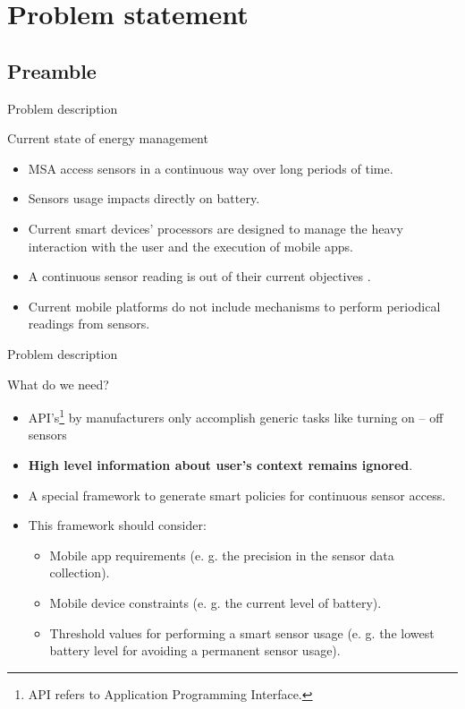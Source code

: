 \section{Problem statement}

\subsection{Preamble}

\begin{frame}{Problem description}
  \begin{block}{Current state of energy management}
    \begin{itemize}
      \item MSA access sensors in a continuous way over long periods of time.
      \item Sensors usage impacts directly on battery.
      \item Current smart devices' processors are designed to manage the heavy interaction with the user and the execution of mobile apps.
      \item A continuous sensor reading is out of their current objectives \citep{Priyantha2011}.
      \item Current mobile platforms do not include mechanisms to perform periodical readings from sensors.
    \end{itemize}
  \end{block}
\end{frame}

\begin{frame}{Problem description}
  \begin{block}{What do we need?}
    \begin{itemize}
      \item API’s\footnote{API refers to Application Programming Interface.} by manufacturers only accomplish generic tasks like turning on – off sensors
      \item \textbf{High level information about user's context remains ignored}.
      \item A special framework to generate smart policies for continuous sensor access.
      \item This framework should consider:
        \begin{itemize}
          \item Mobile app requirements (e. g. the precision in the sensor data collection).
          \item Mobile device constraints (e. g. the current level of battery).
          \item Threshold values for performing a smart sensor usage (e. g. the lowest battery level for avoiding a permanent sensor usage).
        \end{itemize}
    \end{itemize}
  \end{block}
\end{frame}


